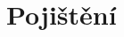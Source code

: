 \documentclass[ekobook.tex]{subfiles}
\begin{document}
\setcounter{section}{1}
\section{Pojištění}
\newpage
\end{document}
